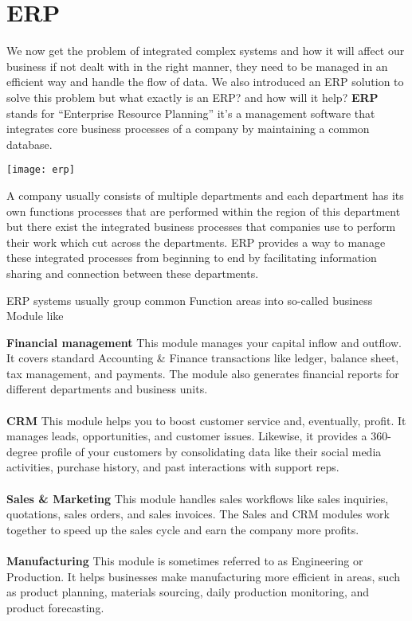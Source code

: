 \chapter{ERP}
We now get the problem of integrated complex systems and how it will affect our business if not dealt with in the 
right manner, they need to be managed in an efficient way and handle the flow of data. We also introduced an 
ERP solution to solve this problem but what exactly is an ERP? and how will it help? \newline \newline
\textbf{ERP} stands for “Enterprise Resource Planning”	 
it’s a management software that integrates core business processes of a company by maintaining a common database. \newline \newline
\begin{center}
    \texttt{[image: erp]}
\end{center}


A company usually consists of multiple departments and each department has its own functions 
processes that are performed within the region of this department but there exist the integrated 
business processes that companies use to perform their work which cut across the departments. 
ERP provides a way to manage these integrated processes from beginning to end by facilitating information 
sharing and connection between these departments. \newline \newline


ERP systems usually group common Function areas into so-called business Module like\\

\begin{adjustwidth}{2cm}{}
\textbf{Financial management} This module manages your capital inflow and outflow. It covers standard Accounting \& Finance transactions like ledger, balance sheet, tax management, and payments. The module also generates financial reports for different departments and business units.\\\\
\textbf{CRM} This module helps you to boost customer service and, eventually, profit. It manages leads, opportunities, and customer issues. Likewise, it provides a 360-degree profile of your customers by consolidating data like their social media activities, purchase history, and past interactions with support reps.\\\\
\textbf{Sales \& Marketing} This module handles sales workflows like sales inquiries, quotations, sales orders, and sales invoices. The Sales and CRM modules work together to speed up the sales cycle and earn the company more profits.\\\\
\textbf{Manufacturing} This module is sometimes referred to as Engineering or Production. It helps businesses make manufacturing more efficient in areas, such as product planning, materials sourcing, daily production monitoring, and product forecasting.\\\\
\end{adjustwidth}

